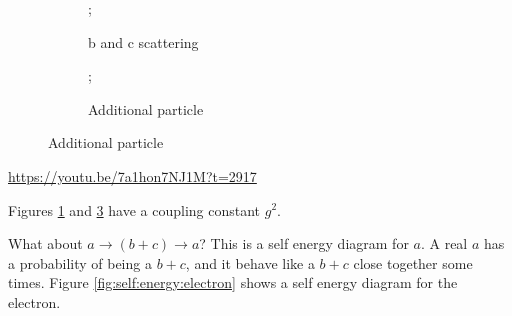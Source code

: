 \documentclass[]{article}
\begin{document}
\begin{figure}[H]
	\caption{$\Psi^\dagger_c\Psi^\dagger_b\Psi_a\Psi^\dagger_a\Psi_b\Psi_c$}
	\begin{subfigure}[t]{0.45\textwidth}
		\caption{b and c scattering}\label{fig:scatter:annihilate}
		;
	\end{subfigure}
	\begin{subfigure}[t]{0.45\textwidth}
		\caption{Additional particle}\label{fig:additional:particle}
		;
	\end{subfigure}
\end{figure}
\url{https://youtu.be/7a1hon7NJ1M?t=2917}


Figures \ref{fig:scatter:annihilate} and \ref{fig:additional:particle} have a coupling constant $g^2$.

What about $a\rightarrow (b+c)\rightarrow a$? This is a self energy diagram for $a$. A real $a$ has a probability of being a $b+c$, and it behave like a $b+c$ close together some times. Figure \ref{fig:self:energy:electron} shows a self energy diagram for the electron.
\end{document}
